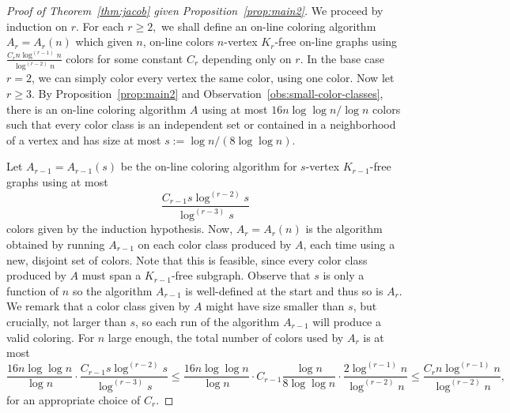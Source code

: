 \documentclass[10pt]{amsart}
\theoremstyle{definition}
\begin{document}
\begin{proof}[Proof of Theorem~\ref{thm:jacob} given Proposition~\ref{prop:main2}]
    We proceed by induction on $r$. For each $r \ge 2,$ we shall define an on-line coloring algorithm $A_r = A_r(n)$ which given $n$, on-line colors $n$-vertex $K_r$-free on-line graphs using $\frac{C_r n \log^{(r-1)}n}{\log^{(r-2)} n}$ colors for some constant $C_r$ depending only on $r$.  In the base case $r=2$, we can simply color every vertex the same color, using one color. Now let $r \ge 3.$ By Proposition~\ref{prop:main2} and Observation~\ref{obs:small-color-classes}, there is an on-line coloring algorithm $A$ using at most $16 n \log \log n / \log n$ colors such that every color class is an independent set or contained in a neighborhood of a vertex and has size at most $s := \log n  / (8 \log \log n)$.

    Let $A_{r-1} = A_{r-1}(s)$ be the on-line coloring algorithm for $s$-vertex $K_{r-1}$-free graphs using at most $$\frac{C_{r-1} s \log^{(r-2)}s}{\log^{(r-3)} s}$$ colors given by the induction hypothesis. Now, $A_r = A_r(n)$ is the algorithm obtained by running $A_{r-1}$ on each color class produced by $A$, each time using a new, disjoint set of colors. Note that this is feasible, since every color class produced by $A$ must span a $K_{r-1}$-free subgraph. Observe that $s$ is only a function of $n$ so the algorithm $A_{r-1}$ is well-defined at the start and thus so is $A_r$. We remark that a color class given by $A$ might have size smaller than $s$, but crucially, not larger than $s$, so each run of the algorithm $A_{r-1}$ will produce a valid coloring. For $n$ large enough, the total number of colors used by $A_r$ is at most
    \[ \frac{16 n\log \log n}{\log n} \cdot \frac{C_{r-1} s \log^{(r-2)} s}{\log^{(r-3)} s} \le \frac{16 n\log \log n}{\log n} \cdot C_{r-1} \frac{\log n}{8\log\log n} \cdot \frac{2\log^{(r-1)} n}{\log^{(r-2)} n} \le \frac{C_r n \log^{(r-1)} n}{\log^{(r-2)} n},
    \]
    for an appropriate choice of $C_r$.    
\end{proof}
\end{document}
